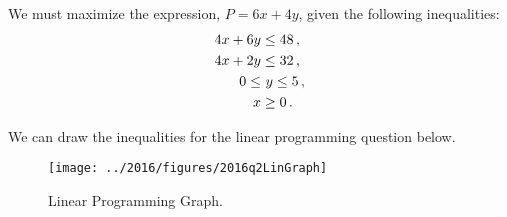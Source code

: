 %
%
\usetikzlibrary{patterns}

\begin{subquestions}
	

\subquestion

We must maximize the expression, $P=6x+4y$, given the following inequalities:
\begin{align}
	4x+6y & \leq 48\,, \nonumber \\
	4x+2y & \leq 32\,, \nonumber \\
	0 \leq & ~ y \leq 5\,, \nonumber \\
	x & \geq 0\,.
\end{align}

\begin{subsubquestions}

	
\subsubquestion

We can draw the inequalities for the linear programming question below.
\begin{figure}[H]
	\begin{center}
		\texttt{[image: ../2016/figures/2016q2LinGraph]}
		\caption{\label{2016:q2:graph:Graph1} Linear Programming Graph.}
	\end{center}
\end{figure}




\end{subsubquestions}
\end{subquestions}
